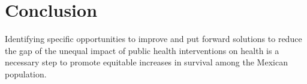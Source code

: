 \documentclass{bmcart}
\begin{document}
\section*{Conclusion}
Identifying specific opportunities to improve and put forward solutions to reduce the gap of  the unequal impact of public health interventions on health is a necessary step to promote equitable increases in survival among the Mexican population.%
 



\end{document}
